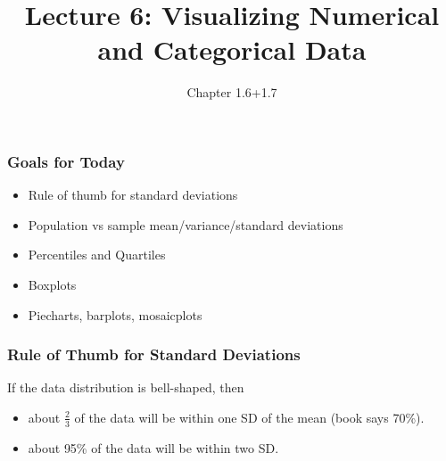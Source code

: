 \documentclass[handout]{beamer}
\title{Lecture 6: Visualizing Numerical and Categorical Data}
\author{Chapter 1.6+1.7}
\date{}
\newcommand{\blue}[1]{\textcolor{blue2}{#1}}
\begin{document}
\begin{frame}
\titlepage
\end{frame}


\begin{frame}[fragile]
\frametitle{Goals for Today}

\begin{itemize}
\item Rule of thumb for standard deviations
\item Population vs sample mean/variance/standard deviations
\item Percentiles and Quartiles
\item Boxplots
\item Piecharts, barplots, mosaicplots
\end{itemize}

\end{frame}


\begin{frame}[fragile]
\frametitle{Rule of Thumb for Standard Deviations}

If the data distribution is bell-shaped, then 
\begin{itemize}
\item about \blue{$\frac{2}{3}$} of the data will be within one SD of the mean (book says 70\%).
\item about \blue{95\%} of the data will be within two SD.
\end{itemize}

\end{frame}
\end{document}
